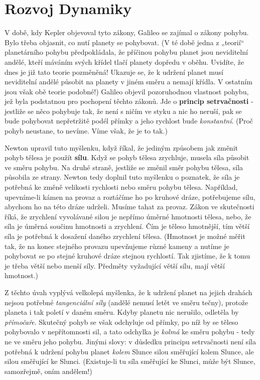   \section{Rozvoj Dynamiky}
    V době, kdy Kepler objevoval tyto zákony, Galileo se zajímal o zákony pohybu. Bylo třeba 
    objasnit, co nutí planety se pohybovat. (V té době jedna z „teorií“ planetárního pohybu 
    předpokládala, že příčinou pohybu planet jsou neviditelní andělé, kteří máváním svých křídel 
    tlačí planety dopředu v oběhu. Uvidíte, že dnes je již tato teorie pozměněná! Ukazuje se, že k 
    udržení planet musí neviditelní andělé působit na planety v jiném směru a nemají křídla. V 
    ostatním jsou však obě teorie podobné!) Galileo objevil pozoruhodnou vlastnost pohybu, jež byla 
    podstatnou pro pochopení těchto zákonů. Jde o \textbf{princip setrvačnosti} - jestliže se něco 
    pohybuje tak, že není s ničím ve styku a nic ho neruší, pak se bude pohybovat nepřetržitě podél 
    přímky a jeho rychlost bude \emph{konstantní}. (Proč pohyb neustane, to nevíme. Víme však, že 
    je to tak.)
    
    Newton upravil tuto myšlenku, když říkal, že jediným způsobem jak změnit pohyb tělesa je použít 
    \textbf{sílu}. Když se pohyb tělesa zrychluje, musela síla působit ve směru pohybu. Na druhé 
    straně, jestliže se změnil směr pohybu tělesa, síla působila ze strany. Newton tedy doplnil 
    tuto myšlenku o poznatek, že síla je potřebná ke změně velikosti rychlosti nebo směru pohybu 
    tělesa. Například, upevníme-li kámen na provaz a roztáčíme ho po kruhové dráze, potřebujeme 
    sílu, abychom ho na této dráze udrželi. Musíme tahat za provaz. Zákon ve skutečnosti říká, že 
    zrychlení vyvolávané silou je nepřímo úměrné hmotnosti tělesa, nebo, že síla je úměrná součinu 
    hmotnosti a zrychlení. Čím je těleso hmotnější, tím větší síla je potřebná k dosažení daného 
    zrychlení tělesa. (Hmotnost je možné měřit tak, že na konec stejného provazu upevňujeme různé 
    kameny a nutíme je pohybovat se po stejné kruhové dráze stejnou rychlostí. Tak zjistíme, že k 
    tomu je třeba větší nebo menší síly. Předměty vyžadující větší sílu, mají větší hmotnost.)
    
    Z těchto úvah vyplývá velkolepá myšlenka, že k udržení planet na jejich drahách nejsou potřebné 
    \emph{tangenciální síly} (andělé nemusí letět ve směru tečny), protože planeta i tak poletí v 
    daném směru. Kdyby planetu nic nerušilo, odletěla by \emph{přímočaře}. Skutečný pohyb se však 
    odchyluje od přímky, po níž by se těleso pohybovalo v nepřítomnosti sil, a tato odchylka je 
    \emph{kolmá} ke směru pohybu - tedy ne ve směru jeho pohybu. Jinými slovy: v důsledku principu 
    setrvačnosti není síla potřebná k udržení pohybu planet \emph{kolem} Slunce silou směřující 
    kolem Slunce, ale silou směřující ke Slunci. (Existuje-li tu síla směřující ke Slunci, může být 
    Slunce, samozřejmě, oním andělem!)
    
